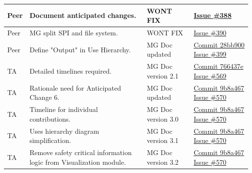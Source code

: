 \documentclass{article}
\begin{document}
\begin{longtable}{|p{2cm}|p{4.5cm}|p{3.5cm}|p{3cm}|}
    Peer &
    Document anticipated changes. &
    WONT FIX & 
    \href{https://github.com/Team6-SixSense/audio360/issues/388}{Issue \#388} \\
    \hline

    Peer &
    MG split SPI and file system. &
    WONT FIX & 
    \href{https://github.com/Team6-SixSense/audio360/issues/390}{Issue \#390} \\
    \hline

    Peer &
    Define "Output" in Use Hierarchy. &
    MG Doc updated & 
    \href{https://github.com/Team6-SixSense/audio360/commit/28bb900}{Commit
        28bb900}
    \newline
    \href{https://github.com/Team6-SixSense/audio360/issues/399}{Issue \#399} \\
    \hline

    TA &
    Detailed timelines required. &
    MG Doc version 2.1 & 
    \href{https://github.com/Team6-SixSense/audio360/commit/766437e}{Commit
        766437e}
    \newline
    \href{https://github.com/Team6-SixSense/audio360/issues/569}{Issue \#569} \\
    \hline

    TA &
    Rationale need for Anticipated Change 6. &
    MG Doc updated & 
    \href{https://github.com/Team6-SixSense/audio360/commit/9b8a467}{Commit
        9b8a467}
    \newline
    \href{https://github.com/Team6-SixSense/audio360/issues/570}{Issue \#570} \\
    \hline

    TA &
    Timeline for individual contributions. &
    MG Doc version 3.0 & 
    \href{https://github.com/Team6-SixSense/audio360/commit/9b8a467}{Commit
        9b8a467}
    \newline
    \href{https://github.com/Team6-SixSense/audio360/issues/570}{Issue \#570} \\
    \hline

    TA &
    Uses hierarchy diagram simplification. &
    MG Doc version 3.1 & 
    \href{https://github.com/Team6-SixSense/audio360/commit/9b8a467}{Commit
        9b8a467}
    \newline
    \href{https://github.com/Team6-SixSense/audio360/issues/570}{Issue \#570} \\
    \hline

    TA &
    Remove safety critical information logic from Visualization module. &
    MG Doc version 3.2 & 
    \href{https://github.com/Team6-SixSense/audio360/commit/9b8a467}{Commit
        9b8a467}
    \newline
    \href{https://github.com/Team6-SixSense/audio360/issues/570}{Issue \#570} \\
    \hline


\end{longtable}
\end{document}
